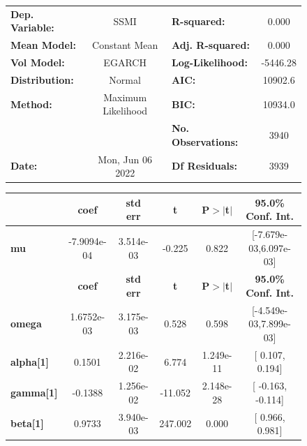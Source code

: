 \documentclass[a4paper, oneside]{discothesis}
\begin{document}
\begin{figure}
\begin{multicols}{2}
{  
\begin{center}
\begin{tabular}{lclc}
\toprule
\textbf{Dep. Variable:} &        SSMI        & \textbf{  R-squared:         } &     0.000   \\
\textbf{Mean Model:}    &   Constant Mean    & \textbf{  Adj. R-squared:    } &     0.000   \\
\textbf{Vol Model:}     &       EGARCH       & \textbf{  Log-Likelihood:    } &   -5446.28  \\
\textbf{Distribution:}  &       Normal       & \textbf{  AIC:               } &    10902.6  \\
\textbf{Method:}        & Maximum Likelihood & \textbf{  BIC:               } &    10934.0  \\
\textbf{}               &                    & \textbf{  No. Observations:  } &    3940     \\
\textbf{Date:}          &  Mon, Jun 06 2022  & \textbf{  Df Residuals:      } &    3939     \\
\bottomrule
\end{tabular}
\begin{tabular}{lccccc}
            & \textbf{coef} & \textbf{std err} & \textbf{t} & \textbf{P$> |$t$|$} & \textbf{95.0\% Conf. Int.}  \\
\midrule
\textbf{mu} &  -7.9094e-04  &    3.514e-03     &    -0.225  &          0.822       &   [-7.679e-03,6.097e-03]    \\
                  & \textbf{coef} & \textbf{std err} & \textbf{t} & \textbf{P$> |$t$|$} & \textbf{95.0\% Conf. Int.}  \\
\midrule
\textbf{omega}    &   1.6752e-03  &    3.175e-03     &     0.528  &          0.598       &   [-4.549e-03,7.899e-03]    \\
\textbf{alpha[1]} &       0.1501  &    2.216e-02     &     6.774  &      1.249e-11       &     [  0.107,  0.194]       \\
\textbf{gamma[1]} &      -0.1388  &    1.256e-02     &   -11.052  &      2.148e-28       &     [ -0.163, -0.114]       \\
\textbf{beta[1]}  &       0.9733  &    3.940e-03     &   247.002  &        0.000         &     [  0.966,  0.981]       \\
\bottomrule
\end{tabular}
\end{center}

}
\end{multicols}
\end{figure}
\end{document}
